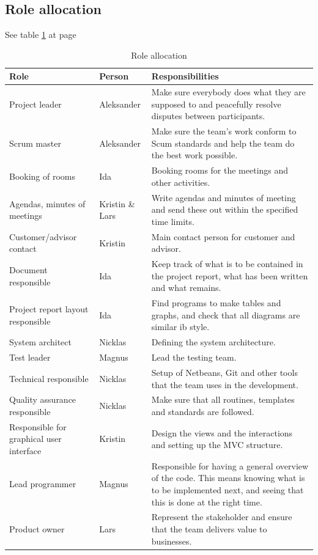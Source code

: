 \subsection{Role allocation}
See table \ref{tab:roleallocation} at page \pageref{tab:roleallocation}
\begin{table}
\begin{tabularx}{\linewidth}{>{\setlength\hsize{.5\hsize}}X|>{\setlength\hsize{0.3\hsize}}X|>{\setlength\hsize{1\hsize}}X}
\textbf{Role} & \textbf{Person} & \textbf{Responsibilities} \\ \hline \hline
Project leader & Aleksander & Make sure everybody does what they are supposed to and peacefully resolve disputes between participants. \\ \hline
Scrum master & Aleksander & Make sure the team’s work conform to Scum standards and help the team do the best work possible. \\ \hline
Booking of rooms & Ida & Booking rooms for the meetings and other activities. \\ \hline
Agendas, minutes of meetings & Kristin \& Lars &Write agendas and minutes of meeting and send these out within the specified time limits. \\ \hline
Customer/advisor contact & Kristin & Main contact person for customer and advisor. \\ \hline
Document responsible & Ida &Keep track of what is to be contained in the project report, what has been written and what remains. \\ \hline
Project report layout responsible & Ida &Find programs to make tables and graphs, and check that all diagrams are similar ib style. \\ \hline
System architect & Nicklas & Defining the system architecture. \\ \hline
Test leader & Magnus & Lead the testing team. \\ \hline
Technical responsible & Nicklas & Setup of Netbeans, Git and other tools that the team uses in the development. \\ \hline
Quality assurance responsible & Nicklas & Make sure that all routines, templates and standards are followed. \\ \hline
Responsible for graphical user interface & Kristin & Design the views and the interactions and setting up the MVC structure. \\ \hline
Lead programmer & Magnus & Responsible for having a general overview of the code. This means knowing what is to be implemented next, and seeing that this is done at the right time. \\ \hline
Product owner & Lars & Represent the stakeholder and ensure that the team delivers value to businesses.
\end{tabularx}
\caption {Role allocation} \label{tab:roleallocation}
\end{table}

